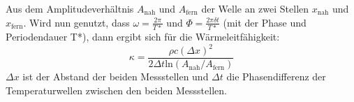 Aus dem Amplitudeverhältnis $A_{\text{nah}}$ und $A_{\text{fern}}$ der Welle an zwei Stellen $x_{\text{nah}}$ und $x_{\text{fern}}$.
Wird nun genutzt, dass $\omega = \frac{2 \pi}{T*}$ und $\Phi = \frac{2 \pi \delta t}{T*}$ (mit der Phase \Phi und Periodendauer T*),
dann ergibt sich für die Wärmeleitfähigkeit:
\begin{equation}
  \kappa = \frac{\rho c (\Delta x)^2}{2 \Delta t \text{ln}(A_{\text{nah}} / A_{\text{fern}})}
  \label{eqn:eqn6}
\end{equation}
$\Delta x$ ist der Abstand der beiden Messstellen und $\Delta t$ die Phasendifferenz der Temperaturwellen zwischen den beiden Messstellen.